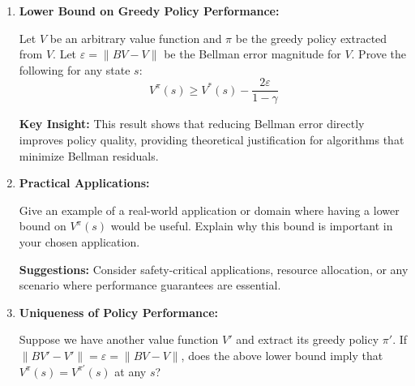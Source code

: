 \documentclass[12pt]{article}
\begin{document}
{{\begin{enumerate}[resume*]
    Prove the following fundamental bounds for an arbitrary value function \( V \) and any policy \( \pi \):
    \[
    \|V - V^{\pi}\| \leq \frac{\|V - B^{\pi}V\|}{1 - \gamma}
    \]
    \[
    \|V - V^{*}\| \leq \frac{\|V - BV\|}{1 - \gamma}
    \]
    
    \textbf{Proof Strategy:}
    \begin{itemize}
        \item Use the contraction properties established in the previous subsection
        \item Consider iterative application of the Bellman operators
        \item Apply the triangle inequality and geometric series
        \item Use the fact that \( V^{\pi} \) and \( V^{*} \) are fixed points
    \end{itemize}
    
    \textbf{Interpretation:} These bounds show that the distance from an arbitrary value function to the true value function is controlled by the Bellman error, scaled by \( \frac{1}{1-\gamma} \).

    \item \textbf{Lower Bound on Greedy Policy Performance:}
    
    Let \( V \) be an arbitrary value function and \( \pi \) be the greedy policy extracted from \( V \). Let \( \varepsilon = \|BV - V\| \) be the Bellman error magnitude for \( V \). Prove the following for any state \( s \):
    \[
    V^{\pi}(s) \geq V^{*}(s) - \frac{2\varepsilon}{1 - \gamma}
    \]
    
    \textbf{Key Insight:} This result shows that reducing Bellman error directly improves policy quality, providing theoretical justification for algorithms that minimize Bellman residuals.

    \item \textbf{Practical Applications:}
    
    Give an example of a real-world application or domain where having a lower bound on \( V^{\pi}(s) \) would be useful. Explain why this bound is important in your chosen application.
    
    \textbf{Suggestions:} Consider safety-critical applications, resource allocation, or any scenario where performance guarantees are essential.

    \item \textbf{Uniqueness of Policy Performance:}
    
    Suppose we have another value function \( V' \) and extract its greedy policy \( \pi' \). If \( \|BV' - V'\| = \varepsilon = \|BV - V\| \), does the above lower bound imply that \( V^{\pi}(s) = V^{\pi'}(s) \) at any \( s \)?
    

\end{enumerate}}}
\end{document}
